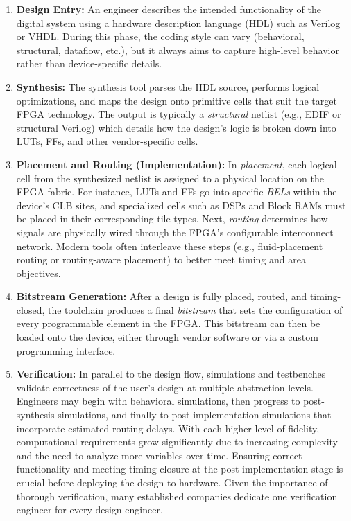 \documentclass{article}
\begin{document}
\begin{multicols}{2}
    \begin{enumerate}
        \item \textbf{Design Entry:} 
            An engineer describes the intended functionality of the digital system using a hardware description language (HDL) such as Verilog or VHDL. 
            During this phase, the coding style can vary (behavioral, structural, dataflow, etc.), but it always aims to capture high-level behavior rather than device-specific details.

        \item \textbf{Synthesis:} 
            The synthesis tool parses the HDL source, performs logical optimizations, and maps the design onto primitive cells that suit the target FPGA technology. 
            The output is typically a \emph{structural} netlist (e.g., EDIF or structural Verilog) which details how the design’s logic is broken down into LUTs, FFs, and other vendor-specific cells.

        \item \textbf{Placement and Routing (Implementation):} 
            In \emph{placement}, each logical cell from the synthesized netlist is assigned to a physical location on the FPGA fabric. 
            For instance, LUTs and FFs go into specific \emph{BELs} within the device’s CLB sites, and specialized cells such as DSPs and Block RAMs must be placed in their corresponding tile types. 
            Next, \emph{routing} determines how signals are physically wired through the FPGA’s configurable interconnect network. 
            Modern tools often interleave these steps (e.g., fluid-placement routing or routing-aware placement) to better meet timing and area objectives.

        \item \textbf{Bitstream Generation:} 
            After a design is fully placed, routed, and timing-closed, the toolchain produces a final \emph{bitstream} that sets the configuration of every programmable element in the FPGA. 
            This bitstream can then be loaded onto the device, either through vendor software or via a custom programming interface.

        \item \textbf{Verification:} 
            In parallel to the design flow, simulations and testbenches validate correctness of the user's design at multiple abstraction levels. 
            Engineers may begin with behavioral simulations, then progress to post-synthesis simulations, and finally to post-implementation simulations that incorporate estimated routing delays. 
            With each higher level of fidelity, computational requirements grow significantly due to increasing complexity and the need to analyze more variables over time. 
            Ensuring correct functionality and meeting timing closure at the post-implementation stage is crucial before deploying the design to hardware. 
            Given the importance of thorough verification, many established companies dedicate one verification engineer for every design engineer.


\end{enumerate}
\end{multicols}
\end{document}
